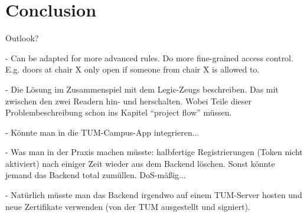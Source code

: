 \section{Conclusion}\label{sec:conclusion}


Outlook?

- Can be adapted for more advanced rules. Do more fine-grained access control. E.g. doors at chair X only open if someone from chair X is allowed to.

- Die Lösung im Zusammenspiel mit dem Legic-Zeugs beschreiben. Das mit zwischen den zwei Readern hin- und herschalten.
Wobei Teile dieser Problembeschreibung schon ins Kapitel ``project flow'' müssen.

- Könnte man in die TUM-Campus-App integrieren...

- Was man in der Praxis machen müsste: halbfertige Registrierungen (Token nicht aktiviert) nach einiger Zeit wieder aus dem Backend löschen. Sonst könnte jemand das Backend total zumüllen. DoS-mäßig...

- Natürlich müsste man das Backend irgendwo auf einem TUM-Server hosten und neue Zertifikate verwenden (von der TUM ausgestellt und signiert).